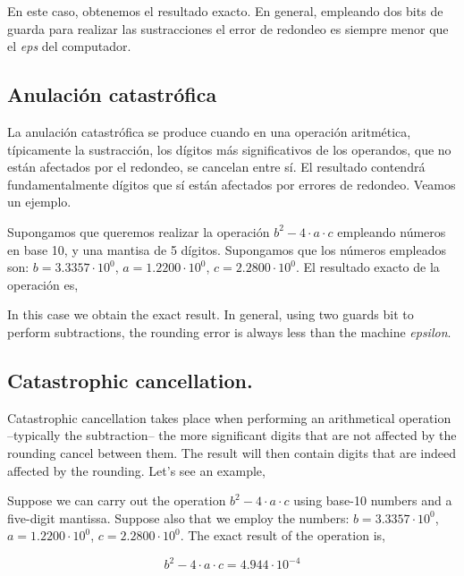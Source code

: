 \begin{paracol}{2}
En este caso, obtenemos el resultado exacto. En general, empleando dos bits de guarda para realizar las sustracciones el error de redondeo es siempre menor que el \emph{eps} del computador.

\subsection{Anulación catastrófica}
La anulación catastrófica se produce cuando en una operación aritmética, típicamente la sustracción,  los dígitos más significativos de los operandos, que no están afectados por el redondeo, se cancelan entre sí. El resultado contendrá fundamentalmente dígitos que sí están afectados por errores de redondeo. Veamos un ejemplo.

Supongamos que queremos realizar la operación $b^2-4\cdot a \cdot c$ empleando números en base 10, y una mantisa de 5 dígitos. Supongamos que los números empleados son: $b= 3.3357\cdot10^0$, $a=1.2200\cdot10^0$, $c=2.2800\cdot10^0$. El resultado exacto de la operación es,

\switchcolumn
In this case we obtain the exact result. In general, using two guards bit to perform subtractions, the rounding error is always less than the machine \emph{epsilon}. 

\subsection{Catastrophic cancellation.}
Catastrophic cancellation takes place when performing an arithmetical operation --typically the subtraction-- the more significant digits that are not affected by the rounding cancel between them. The result will then contain digits that are indeed affected by the rounding. Let's see an example,

Suppose we can carry out the operation $b^2-4\cdot a \cdot c$ using base-10 numbers and a five-digit mantissa. Suppose also that we employ the numbers: $b= 3.3357\cdot10^0$, $a=1.2200\cdot10^0$, $c=2.2800\cdot10^0$. The exact result of the operation is,
\end{paracol}
\begin{equation}
b^2-4\cdot a\cdot c=4.944\cdot10^{-4}
\end{equation}

